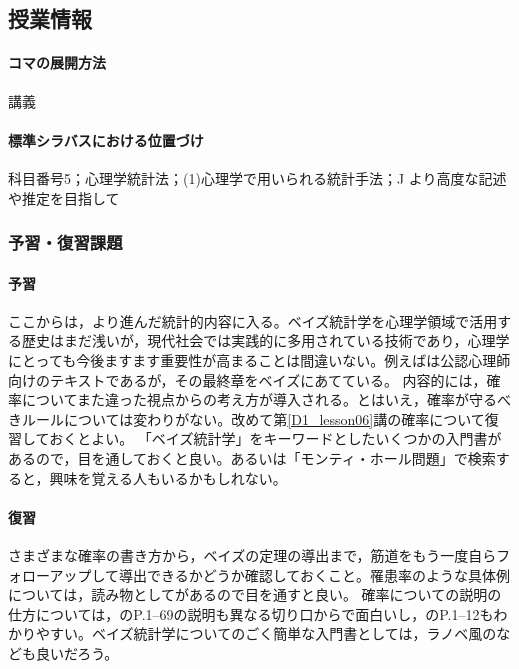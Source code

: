 \subsection{授業情報}
\paragraph{コマの展開方法}
講義
\paragraph{標準シラバスにおける位置づけ}
科目番号5；心理学統計法；(1)心理学で用いられる統計手法；J より高度な記述や推定を目指して
\subsubsection{予習・復習課題}
\paragraph{予習}
ここからは，より進んだ統計的内容に入る。ベイズ統計学を心理学領域で活用する歴史はまだ浅いが，現代社会では実践的に多用されている技術であり，心理学にとっても今後ますます重要性が高まることは間違いない。例えば\citet{野島201903}は公認心理師向けのテキストであるが，その最終章をベイズにあてている。
内容的には，確率についてまた違った視点からの考え方が導入される。とはいえ，確率が守るべきルールについては変わりがない。改めて第\ref{D1_lesson06}講の確率について復習しておくとよい。
「ベイズ統計学」をキーワードとしたいくつかの入門書があるので，目を通しておくと良い。あるいは「モンティ・ホール問題」で検索すると，興味を覚える人もいるかもしれない。
\paragraph{復習}
さまざまな確率の書き方から，ベイズの定理の導出まで，筋道をもう一度自らフォローアップして導出できるかどうか確認しておくこと。罹患率のような具体例については，読み物として\citet{Gerd200309}があるので目を通すと良い。
確率についての説明の仕方については，\citet{平岡200910}のP.1--69の説明も異なる切り口からで面白いし，\citet{石田201801}のP.1--12もわかりやすい。ベイズ統計学についてのごく簡単な入門書としては，ラノベ風の\citet{石田石田201902}なども良いだろう。